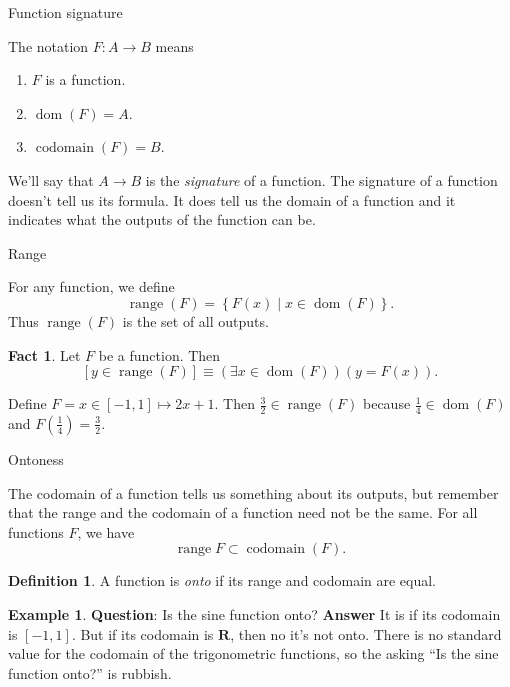 \documentclass[fleqn]{beamer}
\newcommand{\reals}{\mathbf{R}}
\DeclareMathOperator{\range}{range}
\DeclareMathOperator{\domain}{dom}
\DeclareMathOperator{\dom}{dom}
\DeclareMathOperator{\codomain}{codomain}
\theoremstyle{definition}
\newtheorem{mydef}{Definition}
\newtheorem{myex}{Example}
\newtheorem{myfact}{Fact}
\begin{document}
\begin{frame}{Function signature}

The notation \(F : A \to B\) means

\begin{enumerate}

\item \(F\) is a function.
\item \(\dom(F) = A \).
\item  \(\codomain(F) = B\).
\end{enumerate}

\vspace{0.1in}


We'll say that  \(A \to B\) is the \emph{signature} of a function.  The signature of a function doesn't tell us its formula. It does tell us the domain of a function and it indicates what the outputs of the function can be.


\end{frame}
\begin{frame}{Range}
\begin{definition} For any function, we define
\[
   \range(F) = \left \{F(x)  \mid  x \in \domain(F)  \right \}.
\]
Thus \(\range(F)\) is the set of all outputs.
\end{definition}

\begin{myfact} Let \(F\) be a function. Then
\[
     \left[ y \in \range(F)  \right] \equiv  \left(\exists x \in \domain(F) \right)(y = F(x)).
 \]
\end{myfact}

\begin{example} Define \(F = x \in [-1,1] \mapsto 2 x + 1\). Then \(\frac{3}{2} \in \range(F)\) because \(\frac{1}{4} \in \domain(F)\) and \(F(\frac{1}{4}) = \frac{3}{2}\).

\end{example}
\end{frame}
\begin{frame}{Ontoness}

The codomain of a function tells us something about its outputs, but remember that the range and the codomain of a function need not be the same. For all functions \(F\), we have
\[
   \range{F} \subset \codomain(F).
\]

\begin{mydef} A function is \emph{onto} if its range and codomain are equal. \end{mydef}

\begin{myex} \textbf{Question}: Is the sine function onto?  \textbf{Answer} It is if its codomain is \([-1,1]\).  But if its codomain is \(\reals\), then no it's not onto. There is no standard value for the codomain of the trigonometric functions, so the asking ``Is the sine function onto?'' is  rubbish.\end{myex}
\end{frame}
\end{document}
